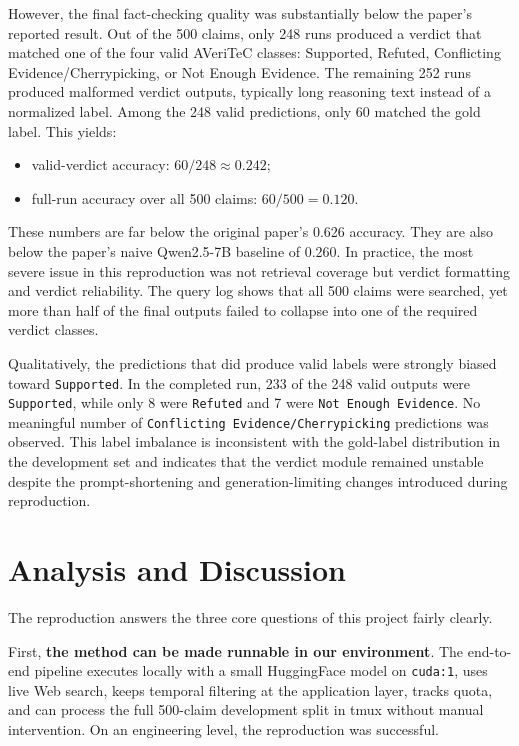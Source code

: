 \documentclass[11pt]{article}
\begin{document}
However, the final fact-checking quality was substantially below the paper's reported result. Out of the 500 claims, only 248 runs produced a verdict that matched one of the four valid AVeriTeC classes: Supported, Refuted, Conflicting Evidence/Cherrypicking, or Not Enough Evidence. The remaining 252 runs produced malformed verdict outputs, typically long reasoning text instead of a normalized label. Among the 248 valid predictions, only 60 matched the gold label. This yields:

\begin{itemize}[leftmargin=*]
\item valid-verdict accuracy: \(60 / 248 \approx 0.242\);
\item full-run accuracy over all 500 claims: \(60 / 500 = 0.120\).
\end{itemize}

These numbers are far below the original paper's 0.626 accuracy. They are also below the paper's naive Qwen2.5-7B baseline of 0.260. In practice, the most severe issue in this reproduction was not retrieval coverage but verdict formatting and verdict reliability. The query log shows that all 500 claims were searched, yet more than half of the final outputs failed to collapse into one of the required verdict classes.

Qualitatively, the predictions that did produce valid labels were strongly biased toward \texttt{Supported}. In the completed run, 233 of the 248 valid outputs were \texttt{Supported}, while only 8 were \texttt{Refuted} and 7 were \texttt{Not Enough Evidence}. No meaningful number of \texttt{Conflicting Evidence/Cherrypicking} predictions was observed. This label imbalance is inconsistent with the gold-label distribution in the development set and indicates that the verdict module remained unstable despite the prompt-shortening and generation-limiting changes introduced during reproduction.

\section*{Analysis and Discussion}
The reproduction answers the three core questions of this project fairly clearly.

First, \textbf{the method can be made runnable in our environment}. The end-to-end pipeline executes locally with a small HuggingFace model on \texttt{cuda:1}, uses live Web search, keeps temporal filtering at the application layer, tracks quota, and can process the full 500-claim development split in tmux without manual intervention. On an engineering level, the reproduction was successful.
\end{document}
